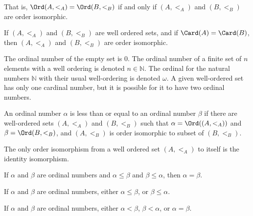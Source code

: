 \documentclass[crop=false,class=book,oneside]{standalone}
\begin{document}
             That is,
             $\Ord(A,<_{A})=\Ord(B,<_{B})$ if and only if
             $(A,<_{A})$ and $(B,<_{B})$ are order isomorphic.
             \begin{theorem*}
                If $(A,<_{A})$ and $(B,<_{B})$ are well ordered
                sets, and if $\Card(A)=\Card(B)$, then
                $(A,<_{A})$ and $(B,<_{B})$ are order
                isomorphic.
             \end{theorem*}
             The ordinal number of the empty set is $0$. The
             ordinal number of a finite set of $n$ elements with
             a well ordering is denoted $n\in\mathbb{N}$.
             The ordinal for the natural numbers $\mathbb{N}$
             with their usual well-ordering is denoted $\omega$.
             A given well-ordered set has only one cardinal number,
             but it is possible for it to have two ordinal numbers.
             \begin{definition}
                An ordinal number $\alpha$ is less than or equal
                to an ordinal number $\beta$ if there are
                well-ordered sets $(A,<_{A})$ and $(B,<_{B})$
                such that $\alpha=\Ord((A,<_{A}))$ and
                $\beta=\Ord(B,<_{B})$, and $(A,<_{B})$ is
                order isomorphic to subset of
                $(B,<_{B})$.
             \end{definition}
             \begin{theorem*}
                The only order isomorphism from a well ordered
                set $(A,<_{A})$ to itself is the identity
                isomorphism.
             \end{theorem*}
             \begin{theorem*}
                If $\alpha$ and $\beta$ are ordinal numbers and
                ${\alpha}\leq{\beta}$ and ${\beta}\leq{\alpha}$,
                then $\alpha=\beta$.
             \end{theorem*}
             \begin{theorem*}
                If $\alpha$ and $\beta$ are ordinal numbers,
                either ${\alpha}\leq{\beta}$, or
                ${\beta}\leq{\alpha}$.
             \end{theorem*}
             \begin{theorem*}
                If $\alpha$ and $\beta$ are ordinal numbers,
                either $\alpha<\beta$, $\beta<\alpha$, or
                $\alpha=\beta$.
             \end{theorem*}
\end{document}
